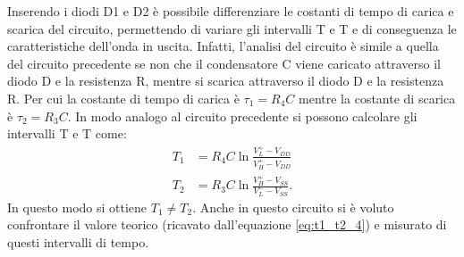 \noindent
Inserendo i diodi D1 e D2 è possibile differenziare le costanti di tempo di carica e scarica del circuito, permettendo di variare gli intervalli T e T e di conseguenza le caratteristiche dell'onda in uscita. Infatti, l'analisi del circuito è simile a quella del circuito precedente se non che il condensatore C viene caricato attraverso il diodo D e la resistenza R, mentre si scarica attraverso il diodo D e la resistenza R. Per cui la costante di tempo di carica è $\tau_1 = R_4C$ mentre la costante di scarica è $\tau_2=R_3C$. In modo analogo al circuito precedente si possono calcolare gli intervalli T e T come:
\begin{equation}
	\begin{split}
		T_1&=R_4C \ln{\frac{V_L^+-V_{DD}}{V_H^+-V_{DD}}} \\
		T_2&=R_3C \ln{\frac{V_H^+-V_{SS}}{V_L^--V_{SS}}}.
	\end{split}
	\label{eq:t1_t2_4}
\end{equation}
In questo modo si ottiene $T_1 \ne T_2$. Anche in questo circuito si è voluto confrontare il valore teorico (ricavato dall'equazione \ref{eq:t1_t2_4}) e misurato di questi intervalli di tempo. 

